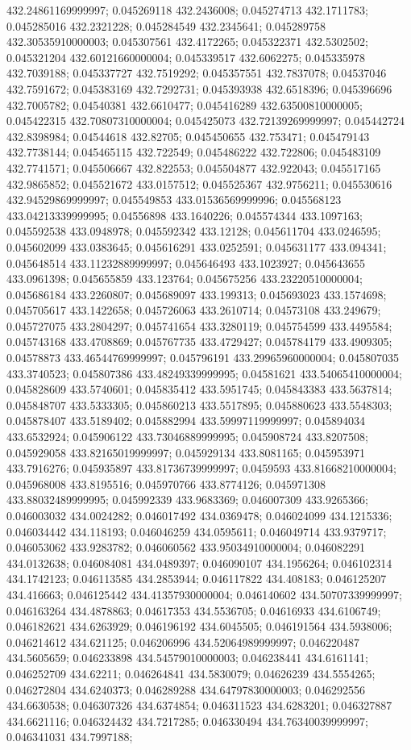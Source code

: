 432.24861169999997; 0.045269118 432.2436008; 0.045274713 432.1711783; 0.045285016 432.2321228; 0.045284549 432.2345641; 0.045289758 432.30535910000003; 0.045307561 432.4172265; 0.045322371 432.5302502; 0.045321204 432.60121660000004; 0.045339517 432.6062275; 0.045335978 432.7039188; 0.045337727 432.7519292; 0.045357551 432.7837078; 0.04537046 432.7591672; 0.045383169 432.7292731; 0.045393938 432.6518396; 0.045396696 432.7005782; 0.04540381 432.6610477; 0.045416289 432.63500810000005; 0.045422315 432.70807310000004; 0.045425073 432.72139269999997; 0.045442724 432.8398984; 0.04544618 432.82705; 0.045450655 432.753471; 0.045479143 432.7738144; 0.045465115 432.722549; 0.045486222 432.722806; 0.045483109 432.7741571; 0.045506667 432.822553; 0.045504877 432.922043; 0.045517165 432.9865852; 0.045521672 433.0157512; 0.045525367 432.9756211; 0.045530616 432.94529869999997; 0.045549853 433.01536569999996; 0.045568123 433.04213339999995; 0.04556898 433.1640226; 0.045574344 433.1097163; 0.045592538 433.0948978; 0.045592342 433.12128; 0.045611704 433.0246595; 0.045602099 433.0383645; 0.045616291 433.0252591; 0.045631177 433.094341; 0.045648514 433.11232889999997; 0.045646493 433.1023927; 0.045643655 433.0961398; 0.045655859 433.123764; 0.045675256 433.23220510000004; 0.045686184 433.2260807; 0.045689097 433.199313; 0.045693023 433.1574698; 0.045705617 433.1422658; 0.045726063 433.2610714; 0.04573108 433.249679; 0.045727075 433.2804297; 0.045741654 433.3280119; 0.045754599 433.4495584; 0.045743168 433.4708869; 0.045767735 433.4729427; 0.045784179 433.4909305; 0.04578873 433.46544769999997; 0.045796191 433.29965960000004; 0.045807035 433.3740523; 0.045807386 433.48249339999995; 0.04581621 433.54065410000004; 0.045828609 433.5740601; 0.045835412 433.5951745; 0.045843383 433.5637814; 0.045848707 433.5333305; 0.045860213 433.5517895; 0.045880623 433.5548303; 0.045878407 433.5189402; 0.045882994 433.59997119999997; 0.045894034 433.6532924; 0.045906122 433.73046889999995; 0.045908724 433.8207508; 0.045929058 433.82165019999997; 0.045929134 433.8081165; 0.045953971 433.7916276; 0.045935897 433.81736739999997; 0.0459593 433.81668210000004; 0.045968008 433.8195516; 0.045970766 433.8774126; 0.045971308 433.88032489999995; 0.045992339 433.9683369; 0.046007309 433.9265366; 0.046003032 434.0024282; 0.046017492 434.0369478; 0.046024099 434.1215336; 0.046034442 434.118193; 0.046046259 434.0595611; 0.046049714 433.9379717; 0.046053062 433.9283782; 0.046060562 433.95034910000004; 0.046082291 434.0132638; 0.046084081 434.0489397; 0.046090107 434.1956264; 0.046102314 434.1742123; 0.046113585 434.2853944; 0.046117822 434.408183; 0.046125207 434.416663; 0.046125442 434.41357930000004; 0.046140602 434.50707339999997; 0.046163264 434.4878863; 0.04617353 434.5536705; 0.04616933 434.6106749; 0.046182621 434.6263929; 0.046196192 434.6045505; 0.046191564 434.5938006; 0.046214612 434.621125; 0.046206996 434.52064989999997; 0.046220487 434.5605659; 0.046233898 434.54579010000003; 0.046238441 434.6161141; 0.046252709 434.62211; 0.046264841 434.5830079; 0.04626239 434.5554265; 0.046272804 434.6240373; 0.046289288 434.64797830000003; 0.046292556 434.6630538; 0.046307326 434.6374854; 0.046311523 434.6283201; 0.046327887 434.6621116; 0.046324432 434.7217285; 0.046330494 434.76340039999997; 0.046341031 434.7997188; 